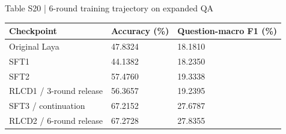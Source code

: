 \documentclass[10pt]{article}
\begin{document}
\begin{center}
\begin{minipage}{\textwidth}
\fontsize{8.5}{10.3}\selectfont
Table S20 | 6-round training trajectory on expanded QA
\par\vspace{4pt}
\begin{tabularx}{\textwidth}{@{}XXX@{}}
\toprule
Checkpoint & Accuracy (\%) & Question-macro F1 (\%) \\
\midrule
Original Laya & 47.8324 & 18.1810 \\
SFT1 & 44.1382 & 18.2350 \\
SFT2 & 57.4760 & 19.3338 \\
RLCD1 / 3-round release & 56.3657 & 19.2395 \\
SFT3 / continuation & 67.2152 & 27.6787 \\
RLCD2 / 6-round release & 67.2728 & 27.8355 \\
\bottomrule
\end{tabularx}
\par{}
\end{minipage}
\end{center}
\end{document}
